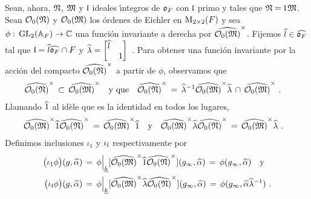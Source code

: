 % 
Sean, ahora, $\frak{N}$, $\frak{M}$ y $\frak{l}$ ideales \'{\i}ntegros de
$\oka{F}$ con $\frak{l}$ primo y tales que $\frak{N}=\frak{l}\,\frak{M}$. Sean
$\cal{O}_{0}(\frak{N})$ y $\cal{O}_{0}(\frak{M})$ los \'{o}rdenes de Eichler en
$\MM_{2\times 2}(F)$ y sea $\phi:\,\GL_{2}(\adeles{F})\rightarrow\bb{C}$ una
funci\'{o}n invariante a derecha por $\Idfin{\cal{O}_{0}(\frak{M})}$. Fijemos
$\hhat{l}\in\Adfin{\oka{F}}$ tal que $\frak{l}=\hhat{l}\Adfin{\oka{F}}\cap F$ y
\begin{math}
	\hhat{\lambda}=\begin{bmatrix} \hhat{l} & \\ & 1 \end{bmatrix}
\end{math}~.
Para obtener una funci\'{o}n invariante por la acci\'{o}n del compacto
$\Idfin{\cal{O}_{0}(\frak{N})}$ a partir de $\phi$, observamos que
\begin{align*}
	\Idfin{\cal{O}_{0}(\frak{N})} \,\subset\,
		\Idfin{\cal{O}_{0}(\frak{M})} & \quad\text{y que}\quad
	\Idfin{\cal{O}_{0}(\frak{N})} \,=\,
		\hhat{\lambda}^{-1}\Idfin{\cal{O}_{0}(\frak{M})}\hhat{\lambda}
		\,\cap\,\Idfin{\cal{O}_{0}(\frak{M})}
	\text{ .}
\end{align*}
%
Llamando $\hhat{1}$ al id\`{e}le que es la identidad en todos los lugares,
\begin{align*}
	\Idfin{\cal{O}_{0}(\frak{M})}\hhat{1}\Idfin{\cal{O}_{0}(\frak{N})}
		\,=\, \Idfin{\cal{O}_{0}(\frak{M})}\hhat{1}
	& \quad\text{y}\quad
	\Idfin{\cal{O}_{0}(\frak{M})}\hhat{\lambda}
			\Idfin{\cal{O}_{0}(\frak{N})}
		\,=\,\Idfin{\cal{O}_{0}(\frak{M})}\hhat{\lambda}
	\text{ .}
\end{align*}
%
Definimos inclusiones $\iota_{1}$ y $\iota_{\frak{l}}$ respectivamente por
\begin{align*}
	\big(\iota_{1}\phi\big)(g,\hhat{\alpha}) & \,=\,\phi\operadorcoclases{\peso{k}}{%
		\Idfin{\cal{O}_{0}(\frak{M})}\hhat{1}%
			\Idfin{\cal{O}_{0}(\frak{N})}}
				(g_{\infty},\hhat{\alpha})
		\,=\, \phi(g_{\infty},\hhat{\alpha}) \quad\text{y} \\
	\big(\iota_{\frak{l}}\phi\big)(g,\hhat{\alpha}) & \,=\,
		\phi\operadorcoclases{\peso{k}}{%
		\Idfin{\cal{O}_{0}(\frak{M})}\hhat{\lambda}%
			\Idfin{\cal{O}_{0}(\frak{N})}}
				(g_{\infty},\hhat{\alpha})
		\,=\, \phi(g_{\infty},\hhat{\alpha}\hhat{\lambda}^{-1})
	\text{ .}
\end{align*}
%

